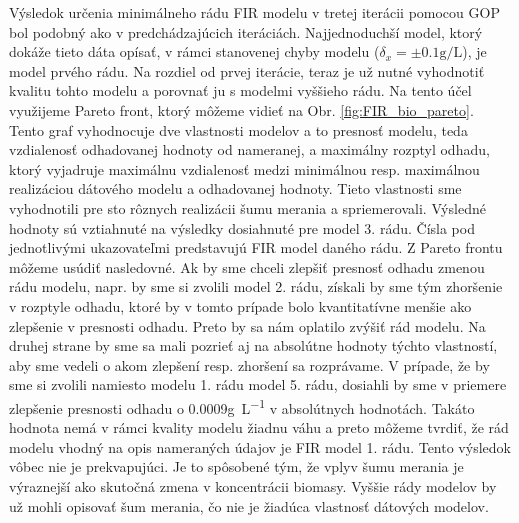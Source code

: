 Výsledok určenia minimálneho rádu FIR modelu v tretej iterácii pomocou GOP bol podobný ako v predchádzajúcich iteráciách. Najjednoduchší model, ktorý dokáže tieto dáta opísať, v rámci stanovenej chyby modelu ($ \delta_{x}=\pm0.1\si{\gram\per\liter} $), je model prvého rádu.
Na rozdiel od prvej iterácie, teraz je už nutné vyhodnotiť kvalitu tohto modelu a porovnať ju s modelmi vyššieho rádu. Na tento účel využijeme Pareto front, ktorý môžeme vidieť na Obr. \ref{fig:FIR_bio_pareto}. Tento graf vyhodnocuje dve vlastnosti modelov a to presnosť modelu, teda vzdialenosť odhadovanej hodnoty od nameranej, a maximálny rozptyl odhadu, ktorý vyjadruje maximálnu vzdialenosť medzi minimálnou resp. maximálnou realizáciou dátového modelu a odhadovanej hodnoty. Tieto vlastnosti sme vyhodnotili pre sto rôznych realizácii šumu merania a spriemerovali. Výsledné hodnoty sú vztiahnuté na výsledky dosiahnuté pre model 3. rádu. Čísla pod jednotlivými ukazovateľmi predstavujú FIR model daného rádu. Z Pareto frontu môžeme usúdiť nasledovné. Ak by sme chceli zlepšiť presnosť odhadu zmenou rádu modelu, napr. by sme si zvolili model 2. rádu, získali by sme tým zhoršenie v rozptyle odhadu, ktoré by v tomto prípade bolo kvantitatívne menšie ako zlepšenie v presnosti odhadu. Preto by sa nám oplatilo zvýšiť rád modelu. Na druhej strane by sme sa mali pozrieť aj na absolútne hodnoty týchto vlastností, aby sme vedeli o akom zlepšení resp. zhoršení sa rozprávame. V prípade, že by sme si zvolili namiesto modelu 1. rádu model 5. rádu, dosiahli by sme v priemere zlepšenie presnosti odhadu o 0.0009\si{\gram\per\liter} v absolútnych hodnotách. Takáto hodnota nemá v rámci kvality modelu žiadnu váhu a preto môžeme tvrdiť, že rád modelu vhodný na opis nameraných údajov je FIR model 1. rádu. Tento výsledok vôbec nie je prekvapujúci. Je to spôsobené tým, že vplyv šumu merania je výraznejší ako skutočná zmena v koncentrácii biomasy. Vyššie rády modelov by už mohli opisovať šum merania, čo nie je žiadúca vlastnosť dátových modelov. 

